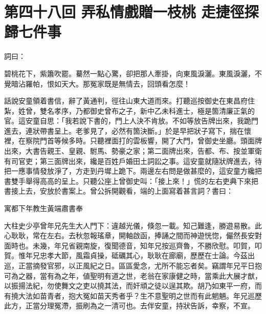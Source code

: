 
\chapter*{第四十八回 弄私情戲贈一枝桃 走捷徑探歸七件事}


詞曰：

\begin{myquote}
碧桃花下，紫簫吹罷。驀然一點心驚，卻把那人牽掛，向東風淚灑。東風淚灑，不覺暗沾羅帕，恨如天大。那冤家既是無情去，回頭看怎麼！

\end{myquote}

話說安童領着書信，辭了黃通判，徑往山東大道而來。打聽巡按御史在東昌府住紮，姓曾，雙名孝序，乃都御史曾布之子，新中乙未科進士，極是箇清廉正氣的官。這安童自思：「我若說下書的，門上人決不肯放。不如等放告牌出來，我跪門進去，連狀帶書呈上。老爹見了，必然有箇決斷。」於是早把狀子寫下，揣在懷裡，在察院門首等候多時。只聽裡面打的雲板響，開了大門，曾御史坐廳。頭面牌出來，大書告親王、皇親、駙馬、勢豪之家；{}第二面牌出來，告都、布、按並軍衛有司官吏；第三面牌出來，纔是百姓戶婚田土詞訟之事。這安童就隨狀牌進去，待把一應事情發放淨了，方走到丹墀上跪下。兩邊左右問是做甚麼的，這安童方纔把書雙手舉得高高的呈上。只聽公座上曾御史叫：「接上來！」慌的左右吏典下來把書接上去，安放於書案上。曾公拆開觀看，端的上面寫着甚言詞？書曰：

\begin{myquote}[\markfont]
寓都下年教生黃端肅書奉

大柱史少亭曾年兄先生大人門下：違越光儀，倏忽一載。知己難逢，勝遊易散。此心耿耿，常在左右。去秋忽報瑤章，開軸啟函，捧誦之間而神遊恍惚，儼然長安對面時也。未幾，年兄省親南旋，復聞德音，知年兄按巡齊魯，不勝欣慰。叩賀，叩賀。惟年兄忠孝大節，風霜貞操，砥礪其心，耿耿在廊廟，歷歷在士論。今茲出巡，正當摘發官邪，以正風紀之日。區區愛念，尤所不能忘者矣。竊謂年兄平日抱可為之器，當有為之年，値聖明有道之世，老翁在家康健之時，當乘此大展才猷，以振揚法紀，勿使舞文之吏以撓其法，而奸頑之徒以逞其欺。胡乃如東平一府，而有撓大法如苗青者，抱大冤如苗天秀者乎？生不意聖明之世而有此魍魎。年兄巡歷此方，正當分理冤滯，振刷為之一清可也。去伴安童，持狀告訴，幸察，不宣。

\end{myquote}

